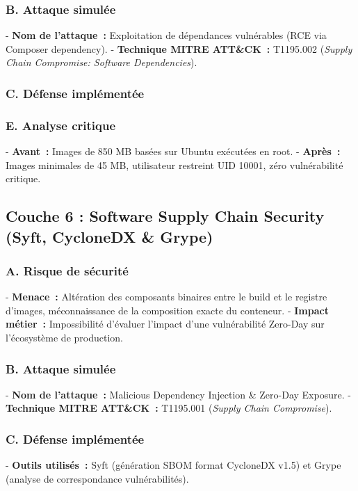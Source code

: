 \subsubsection{B. Attaque simulée}
- \textbf{Nom de l'attaque~:} Exploitation de dépendances vulnérables (RCE via Composer dependency).
- \textbf{Technique MITRE ATT\&CK~:} T1195.002 (\textit{Supply Chain Compromise: Software Dependencies}).

\subsubsection{C. Défense implémentée}

\vspace{0.3cm}
\subsubsection{E. Analyse critique}
- \textbf{Avant~:} Images de 850 MB basées sur Ubuntu exécutées en root.
- \textbf{Après~:} Images minimales de 45 MB, utilisateur restreint UID 10001, zéro vulnérabilité critique.

\subsection{Couche 6 : Software Supply Chain Security (Syft, CycloneDX \& Grype)}

\vspace{0.3cm}
\subsubsection{A. Risque de sécurité}
- \textbf{Menace~:} Altération des composants binaires entre le build et le registre d'images, méconnaissance de la composition exacte du conteneur.
- \textbf{Impact métier~:} Impossibilité d'évaluer l'impact d'une vulnérabilité Zero-Day sur l'écosystème de production.

\subsubsection{B. Attaque simulée}
- \textbf{Nom de l'attaque~:} Malicious Dependency Injection \& Zero-Day Exposure.
- \textbf{Technique MITRE ATT\&CK~:} T1195.001 (\textit{Supply Chain Compromise}).

\subsubsection{C. Défense implémentée}
- \textbf{Outils utilisés~:} Syft (génération SBOM format CycloneDX v1.5) et Grype (analyse de correspondance vulnérabilités).

